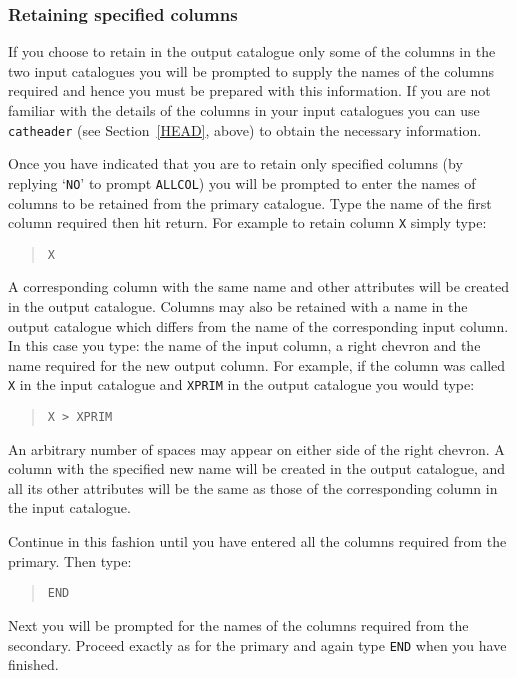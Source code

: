 \documentclass[twoside,11pt]{article}
\renewcommand{\_}{\texttt{\symbol{95}}}
\begin{document}
\subsubsection{\label{PAIR_INP_COL}Retaining specified columns}

If you choose to retain in the output catalogue only some of the columns
in the two input catalogues you will be prompted to supply the names of
the columns required and hence you must be prepared with this information.
If you are not familiar with the details of the columns in your input
catalogues you can use {\tt catheader} (see Section~\ref{HEAD}, above) to
obtain the necessary information.

Once you have indicated that you are to retain only specified columns (by
replying `{\tt NO}' to prompt {\tt ALLCOL}) you will be prompted to enter
the names of columns to be retained from the primary catalogue. Type the
name of the first column required then hit return. For example to retain
column {\tt X} simply type:

\begin{verse}
{\tt X}
\end{verse}

A corresponding column with the same name and other attributes will be
created in the output catalogue. Columns may also be retained with a name
in the output catalogue which differs from the name of the corresponding
input column. In this case you type: the name of the input column, a right
chevron and the name required for the new output column. For example, if
the column was called {\tt X} in the input catalogue and {\tt X\_PRIM}
in the output catalogue you would type:

\begin{verse}
{\tt X > X\_PRIM}
\end{verse}

An arbitrary number of spaces may appear on either side of the right
chevron. A column with the specified new name will be created in the
output catalogue, and all its other attributes will be the same as those
of the corresponding column in the input catalogue.

Continue in this fashion until you have entered all the columns required
from the primary.  Then type:

\begin{verse}
{\tt END}
\end{verse}

Next you will be prompted for the names of the columns required from the
secondary. Proceed exactly as for the primary and again type {\tt END}
when you have finished.
\end{document}
